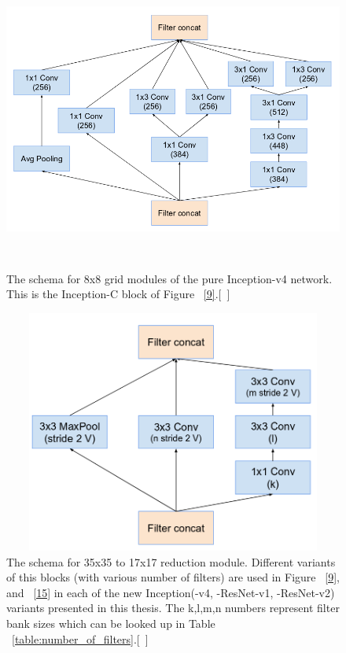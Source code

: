 \documentclass[a4paper,12pt, twoside]{NITKReport}
\begin{document}
 \begin{figure}
 \centering
 
    \includegraphics[height=10cm,width=16cm]{figure6.png}
    \caption{The schema for 8x8 grid modules of the pure Inception-v4 network. This is the Inception-C block of Figure ~\ref{9}.[~\cite{szegedy2017inception}]}
    \label{6}
  
\end{figure}

\begin{figure}[h]
  \centering
  
    \includegraphics[height=8cm,width=15cm]{figure7.png}
    \caption{The schema for 35x35 to 17x17 reduction module. Different variants of this blocks (with various number of filters) are used in Figure ~\ref{9}, and ~\ref{15} in each of the new Inception(-v4, -ResNet-v1, -ResNet-v2) variants presented in this thesis. The k,l,m,n numbers represent filter bank sizes which can be looked up in Table ~\ref{table:number_of_filters}.[~\cite{szegedy2017inception}]}
    \label{7}
  
 \end{figure}
 
\end{document}
